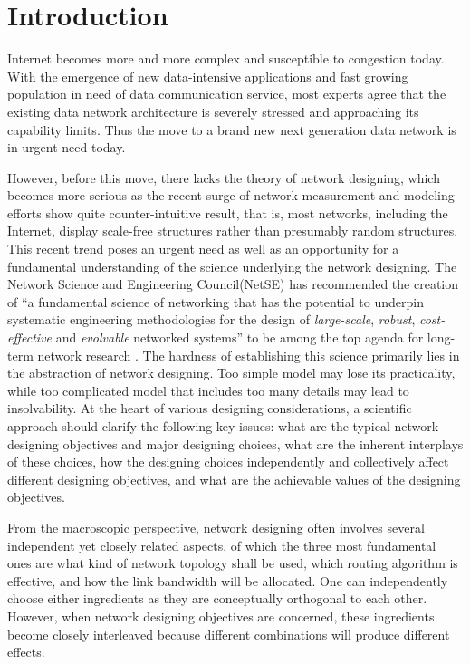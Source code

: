 \documentclass[journal]{IEEEtran}
\begin{document}
 \section{Introduction}
 Internet becomes more and more complex and
susceptible to congestion today. With the emergence of new
data-intensive applications and fast growing population in need of
data communication service, most experts agree that the existing
data network architecture is severely stressed and approaching its
capability limits\cite{routing-scaling, huston-1, huston-2,
claffy2003}. Thus the move to a brand new next generation data
network is in urgent need today.

However, before this move, there lacks the theory of network
designing, which becomes more serious as the recent surge of network
measurement and modeling efforts show quite counter-intuitive
result, that is, most networks, including the Internet, display
scale-free structures rather than presumably random
structures\cite{powerlaw1999,BA,GLP,dk-series}. This recent trend
poses an urgent need as well as an opportunity for a fundamental
understanding of the science underlying the network designing. The
Network Science and Engineering Council(NetSE) has recommended the
creation of ``a fundamental science of networking that has the
potential to underpin systematic engineering methodologies for the
design of \emph{large-scale}, \emph{robust}, \emph{cost-effective}
and \emph{evolvable} networked systems'' to be among the top agenda
for long-term network research \cite{netse}. The hardness of
establishing this science primarily lies in the abstraction of
network designing. Too simple model may lose its practicality, while
too complicated model that includes too many details may lead to
insolvability. At the heart of various designing considerations, a
scientific approach should clarify the following key issues: what
are the typical network designing objectives and major designing
choices, what are the inherent interplays of these choices, how the
designing choices independently and collectively affect different
designing objectives, and what are the achievable values of the
designing objectives.


From the macroscopic perspective, network designing often involves
several independent yet closely related aspects, of which the three
most fundamental ones are what kind of network topology shall be
used, which routing algorithm is effective, and how the link
bandwidth will be allocated. One can independently choose either
ingredients as they are conceptually orthogonal to each other.
However, when network designing objectives are concerned, these
ingredients become closely interleaved because different
combinations will produce different effects.
\end{document}
